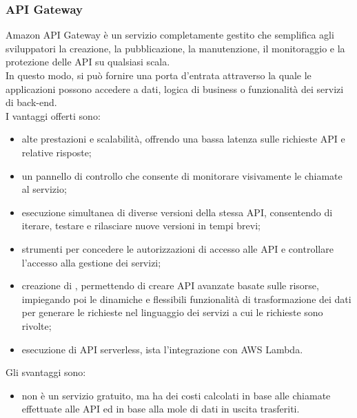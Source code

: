 \subsubsection{API Gateway}
Amazon API Gateway è un servizio completamente gestito che semplifica agli sviluppatori la creazione, la pubblicazione, la manutenzione, il monitoraggio e la protezione delle API su qualsiasi scala.\\
In questo modo, si può fornire una porta d'entrata attraverso la quale le applicazioni possono accedere a dati, logica di business o funzionalità dei servizi di back-end.\\
I vantaggi offerti sono:
\begin{itemize}
	\item alte prestazioni e scalabilità, offrendo una bassa latenza sulle richieste API e relative risposte;
	\item un pannello di controllo che consente di monitorare visivamente le chiamate al servizio;
	\item esecuzione simultanea di diverse versioni della stessa API, consentendo di iterare, testare e rilasciare nuove versioni in tempi brevi;
	\item strumenti per concedere le autorizzazioni di accesso alle API e controllare l'accesso alla gestione dei servizi;
	\item creazione di  , permettendo di creare API avanzate basate sulle risorse, impiegando poi le dinamiche e flessibili funzionalità di trasformazione dei dati per generare le richieste nel linguaggio dei servizi a cui le richieste sono rivolte;
	\item esecuzione di API serverless, ista l'integrazione con AWS Lambda.
\end{itemize}
Gli svantaggi sono:
\begin{itemize}
	\item non è un servizio gratuito, ma ha dei costi calcolati in base alle chiamate effettuate alle API ed in base alla mole di dati in uscita trasferiti.
\end{itemize}

